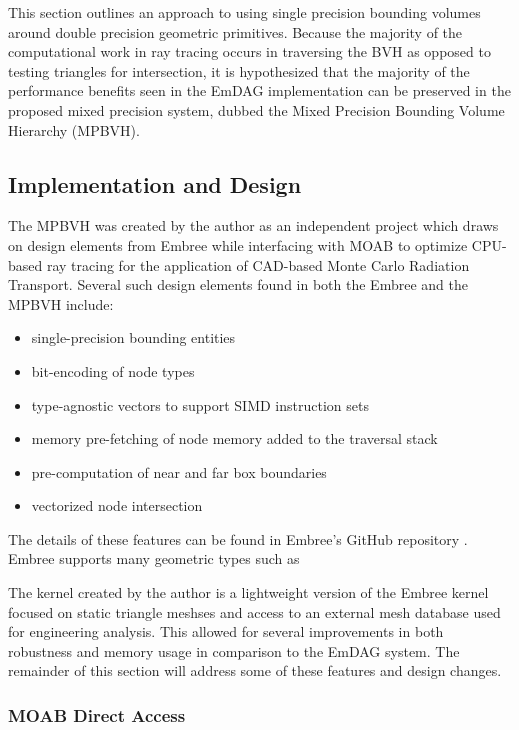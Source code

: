 This section outlines an approach to using single precision bounding volumes
around double precision geometric primitives. Because the majority of the
computational work in ray tracing occurs in traversing the BVH as opposed to
testing triangles for intersection, it is hypothesized that the majority of the
performance benefits seen in the EmDAG implementation can be preserved in the
proposed mixed precision system, dubbed the Mixed Precision Bounding Volume
Hierarchy (MPBVH).

\subsection{Implementation and Design}

The MPBVH was created by the author as an independent project which draws on
design elements from Embree while interfacing with MOAB to optimize CPU-based
ray tracing for the application of CAD-based Monte Carlo Radiation
Transport. Several such design elements found in both the Embree and the MPBVH
include:

\begin{itemize}
  \item single-precision bounding entities
  \item bit-encoding of node types
  \item type-agnostic vectors to support SIMD instruction sets
  \item memory pre-fetching of node memory added to the traversal stack
  \item pre-computation of near and far box boundaries
  \item vectorized node intersection
\end{itemize}

The details of these features can be found in Embree's GitHub repository
\cite{Embree}. Embree supports many geometric types such as 

The kernel created by the author is a lightweight version of the
Embree kernel focused on static triangle meshses and access to an external mesh
database used for engineering analysis. This allowed for several improvements in
both robustness and memory usage in comparison to the EmDAG system. The
remainder of this section will address some of these features and design
changes.

\subsubsection{MOAB Direct Access}

